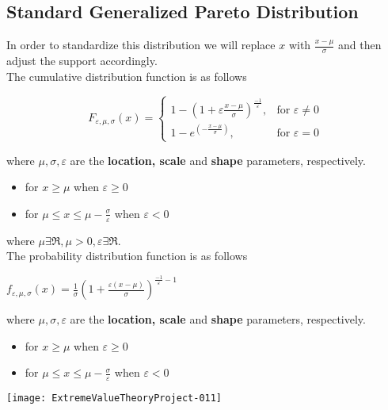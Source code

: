 \documentclass[11pt,a4paper]{article}
\theoremstyle{plain}
\begin{document}
\subsection*{Standard Generalized Pareto Distribution}
In order to standardize this distribution we will  replace $x$ with $\frac{x-\mu}{\sigma}$ and then adjust the support accordingly. \\
The cumulative distribution function is as follows
\begin{center}
 \[
     F_{\varepsilon,\mu,\sigma}(x)=\left\{
                \begin{array}{ll}
                  1-(1+\varepsilon \frac{x-\mu}{\sigma})^{\frac{-1}{\varepsilon}},&\text{for  $\varepsilon \neq 0$}\\
                  1-e^{(-\frac{x-\mu}{\sigma})},&\text {for $\varepsilon =0$}
                \end{array}
              \right.
 \]
\end{center}
where $\mu,\sigma,\varepsilon$ are the \textbf{location, scale} and \textbf{shape} parameters, respectively.
\begin{itemize}
  \item for $x \geq \mu$ when $\varepsilon \geq 0$
  \item for $\mu \leq x \leq \mu-\frac{\sigma}{\varepsilon}$ when $\varepsilon <0$
\end{itemize}
where $\mu \exists \Re, \mu >0, \varepsilon \exists \Re$. \\
The probability distribution function is as follows

\begin{center}
$f_{\varepsilon,\mu,\sigma}(x)=\frac{1}{\sigma}(1+\frac{\varepsilon(x-\mu)}{\sigma})^{\frac{-1}{\varepsilon}-1}$
\end{center}
where $\mu,\sigma,\varepsilon$ are the \textbf{location, scale} and \textbf{shape} parameters, respectively.
\begin{itemize}
  \item for $x \geq \mu$ when $\varepsilon \geq 0$ 
  \item for $\mu \leq x \leq \mu-\frac{\sigma}{\varepsilon}$ when $\varepsilon <0$
\end{itemize}


\texttt{[image: ExtremeValueTheoryProject-011]}
\end{document}
